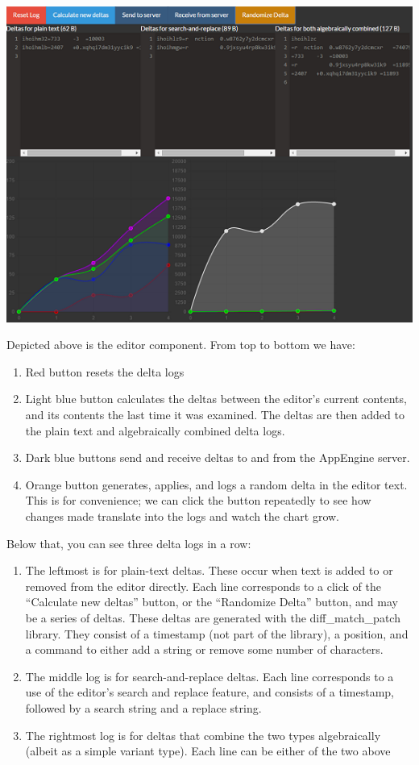 \documentclass[12pt,a4paper]{article}
\begin{document}
		\begin{center}\includegraphics{frontend1}\end{center}
		
		Depicted above is the editor component. From top to bottom we have:
				
		\begin{enumerate}
			\item Red button resets the delta logs
			\item Light blue button calculates the deltas between the editor’s current contents, and its contents the last time it was examined. The deltas are then added to the plain text and algebraically combined delta logs.
			\item Dark blue buttons send and receive deltas to and from the AppEngine server.
			\item Orange button generates, applies, and logs a random delta in the editor text. This is for convenience; we can click the button repeatedly to see how changes made translate into the logs and watch the chart grow.
		\end{enumerate}
		
		Below that, you can see three delta logs in a row:
		
		\begin{enumerate}
			\item The leftmost is for plain-text deltas. These occur when text is added to or removed from the editor directly. Each line corresponds to a click of the “Calculate new deltas” button, or the “Randomize Delta” button, and may be a series of deltas. These deltas are generated with the diff\_match\_patch library. They consist of a timestamp (not part of the library), a position, and a command to either add a string or remove some number of characters.
			\item The middle log is for search-and-replace deltas. Each line corresponds to a use of the editor’s search and replace feature, and consists of a timestamp, followed by a search string and a replace string.
			\item The rightmost log is for deltas that combine the two types algebraically (albeit as a simple variant type). Each line can be either of the two above
		\end{enumerate}
		
\end{document}
